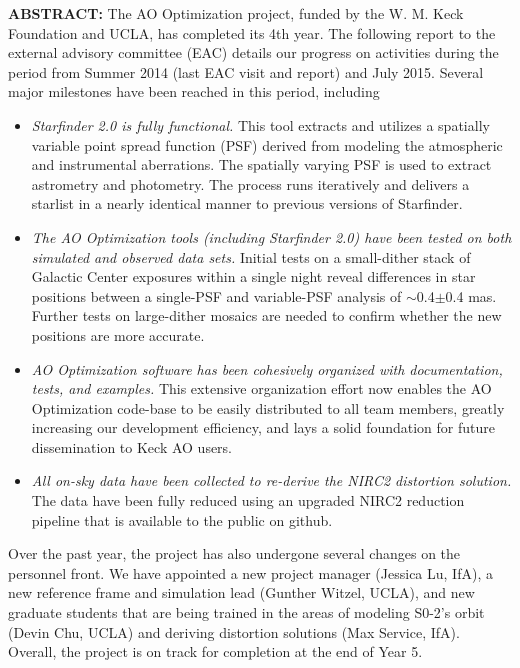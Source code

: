 \textbf{ABSTRACT:} The AO Optimization project, funded by the W. M. Keck Foundation and UCLA, has completed its 4th year. The following report to the external advisory committee (EAC) details our progress on activities during the period from Summer 2014 (last EAC visit and report) and July 2015. Several major milestones have been reached in this period, including
\begin{itemize}
\item {\em Starfinder 2.0 is fully functional.} This tool extracts and utilizes a spatially variable point spread function (PSF) derived from modeling the atmospheric and instrumental aberrations. The spatially varying PSF is used to extract astrometry and photometry. The process runs iteratively and delivers a starlist in a nearly identical manner to previous versions of Starfinder.

\item {\em The AO Optimization tools (including Starfinder 2.0) have been tested on both simulated and observed data sets.} Initial tests on a small-dither stack of Galactic Center exposures within a single night reveal differences in star positions between a single-PSF and variable-PSF analysis of $\sim$0.4$\pm$0.4 mas. Further tests on large-dither mosaics are needed to confirm whether the new positions are more accurate.

\item {\em AO Optimization software has been cohesively organized with documentation, tests, and examples.} This extensive organization effort now enables the AO Optimization code-base to be easily distributed to all team members, greatly increasing our development efficiency, and lays a solid foundation for future dissemination to Keck AO users.

\item {\em All on-sky data have been collected to re-derive the NIRC2 distortion solution.}
The data have been fully reduced using an upgraded NIRC2 reduction pipeline that is available to the public on github.

\end{itemize}
Over the past year, the project has also undergone several changes on the personnel front. We have appointed a new project manager (Jessica Lu, IfA), a new reference frame and simulation lead (Gunther Witzel, UCLA), and new graduate students that are being trained in the areas of modeling S0-2’s orbit (Devin Chu, UCLA) and deriving distortion solutions (Max Service, IfA). Overall, the project is on track for completion at the end of Year 5.


  